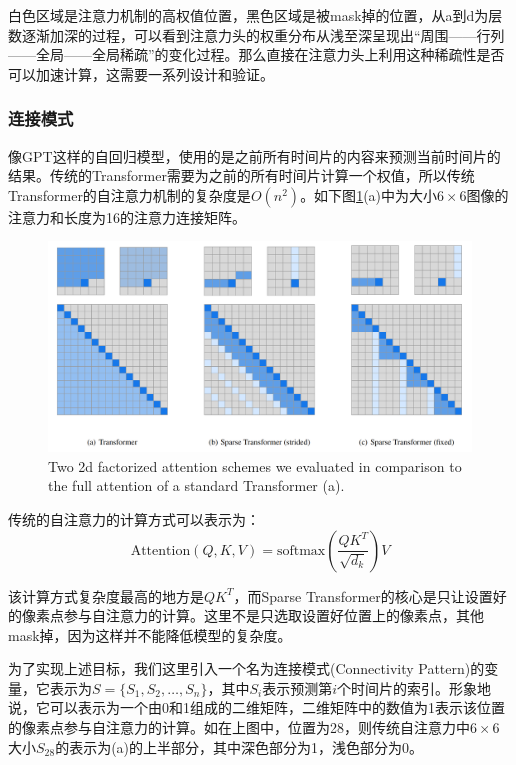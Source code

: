 白色区域是注意力机制的高权值位置，黑色区域是被mask掉的位置，从a到d为层数逐渐加深的过程，可以看到注意力头的权重分布从浅至深呈现出“周围——行列——全局——全局稀疏”的变化过程。那么直接在注意力头上利用这种稀疏性是否可以加速计算，这需要一系列设计和验证。

\subsubsection{连接模式}

像GPT这样的自回归模型，使用的是之前所有时间片的内容来预测当前时间片的结果。传统的Transformer需要为之前的所有时间片计算一个权值，所以传统Transformer的自注意力机制的复杂度是$O(n^2)$。如下图\ref{fig:iwslt-wmt2}(a)中为大小$6\times6$图像的注意力和长度为16的注意力连接矩阵。

\begin{figure}[h]
    \centering
    \includegraphics[width=\textwidth]{img/SC/SC2.jpg}
    \caption{Two 2d factorized attention schemes we evaluated in comparison to the full attention of a standard Transformer (a).}
    \label{fig:iwslt-wmt2}
\end{figure}

传统的自注意力的计算方式可以表示为：
\[
\text{Attention}(Q, K, V) = \text{softmax}\left(\frac{QK^T}{\sqrt{d_k}}\right)V
\]

该计算方式复杂度最高的地方是$QK^T$，而Sparse Transformer的核心是只让设置好的像素点参与自注意力的计算。这里不是只选取设置好位置上的像素点，其他mask掉，因为这样并不能降低模型的复杂度。

为了实现上述目标，我们这里引入一个名为连接模式(Connectivity Pattern)的变量，它表示为$S = \{S_1, S_2, \ldots, S_n\}$，其中$S_i$表示预测第$i$个时间片的索引。形象地说，它可以表示为一个由0和1组成的二维矩阵，二维矩阵中的数值为1表示该位置的像素点参与自注意力的计算。如在上图中，位置为28，则传统自注意力中$6\times6$大小$S_{28}$的表示为(a)的上半部分，其中深色部分为1，浅色部分为0。

